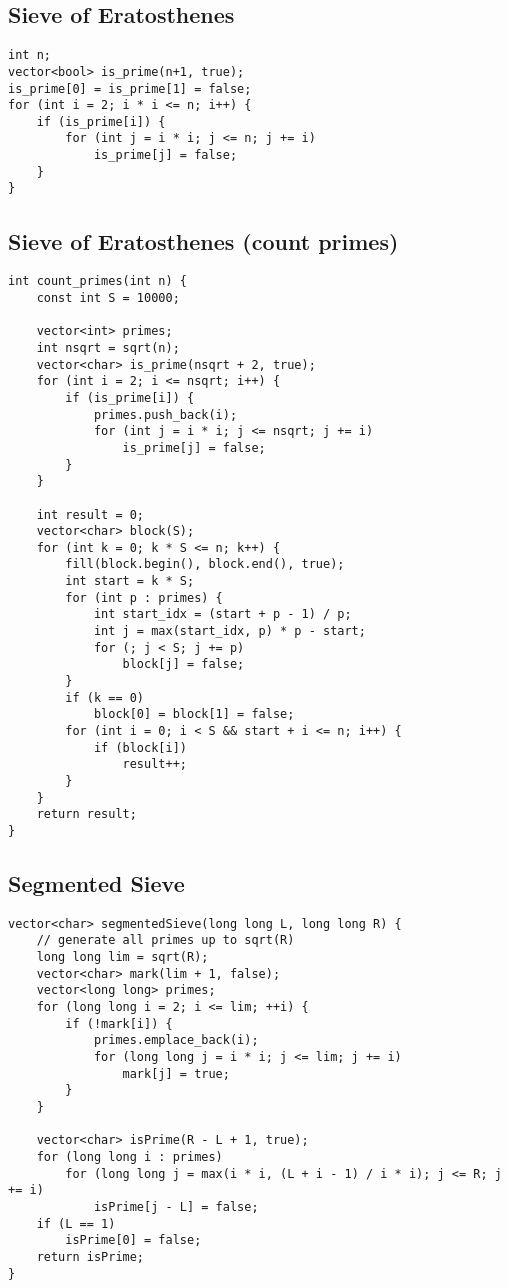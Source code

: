 \documentclass{article}
\begin{document}
\subsection{Sieve of Eratosthenes}
\begin{lstlisting}
int n;
vector<bool> is_prime(n+1, true);
is_prime[0] = is_prime[1] = false;
for (int i = 2; i * i <= n; i++) {
    if (is_prime[i]) {
        for (int j = i * i; j <= n; j += i)
            is_prime[j] = false;
    }
}
\end{lstlisting}
\subsection{Sieve of Eratosthenes (count primes)}
\begin{lstlisting}
int count_primes(int n) {
    const int S = 10000;

    vector<int> primes;
    int nsqrt = sqrt(n);
    vector<char> is_prime(nsqrt + 2, true);
    for (int i = 2; i <= nsqrt; i++) {
        if (is_prime[i]) {
            primes.push_back(i);
            for (int j = i * i; j <= nsqrt; j += i)
                is_prime[j] = false;
        }
    }

    int result = 0;
    vector<char> block(S);
    for (int k = 0; k * S <= n; k++) {
        fill(block.begin(), block.end(), true);
        int start = k * S;
        for (int p : primes) {
            int start_idx = (start + p - 1) / p;
            int j = max(start_idx, p) * p - start;
            for (; j < S; j += p)
                block[j] = false;
        }
        if (k == 0)
            block[0] = block[1] = false;
        for (int i = 0; i < S && start + i <= n; i++) {
            if (block[i])
                result++;
        }
    }
    return result;
}

\end{lstlisting}
\subsection{Segmented Sieve}
\begin{lstlisting}
vector<char> segmentedSieve(long long L, long long R) {
    // generate all primes up to sqrt(R)
    long long lim = sqrt(R);
    vector<char> mark(lim + 1, false);
    vector<long long> primes;
    for (long long i = 2; i <= lim; ++i) {
        if (!mark[i]) {
            primes.emplace_back(i);
            for (long long j = i * i; j <= lim; j += i)
                mark[j] = true;
        }
    }

    vector<char> isPrime(R - L + 1, true);
    for (long long i : primes)
        for (long long j = max(i * i, (L + i - 1) / i * i); j <= R; j += i)
            isPrime[j - L] = false;
    if (L == 1)
        isPrime[0] = false;
    return isPrime;
}
\end{lstlisting}
\end{document}
